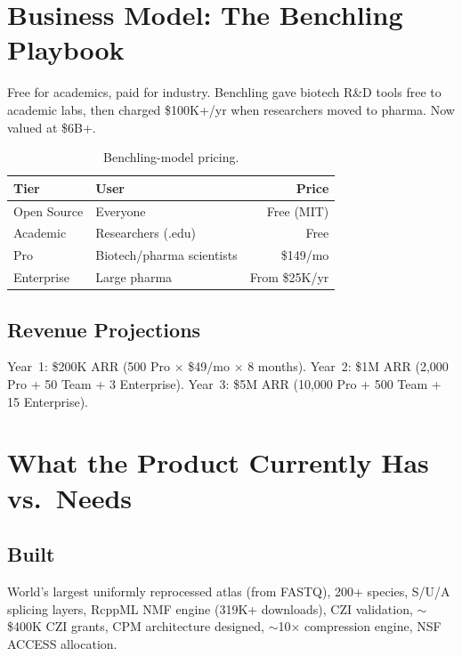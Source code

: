 \documentclass[10pt,twocolumn,letterpaper]{article}
\begin{document}
\section{Business Model: The Benchling Playbook}
\label{sec:benchling}

Free for academics, paid for industry. Benchling gave biotech R\&D tools free
to academic labs, then charged \$100K+/yr when researchers moved to pharma.
Now valued at \$6B+.

\begin{table}[h]
\centering
\small
\begin{tabular}{@{}llr@{}}
\toprule
\textbf{Tier} & \textbf{User} & \textbf{Price} \\
\midrule
Open Source & Everyone & Free (MIT) \\
Academic & Researchers (.edu) & Free \\
Pro & Biotech/pharma scientists & \$149/mo \\
Enterprise & Large pharma & From \$25K/yr \\
\bottomrule
\end{tabular}
\caption{Benchling-model pricing.}
\label{tab:benchling}
\end{table}

\subsection{Revenue Projections}

Year~1: \$200K ARR (500 Pro $\times$ \$49/mo $\times$ 8 months).
Year~2: \$1M ARR (2,000 Pro + 50 Team + 3 Enterprise).
Year~3: \$5M ARR (10,000 Pro + 500 Team + 15 Enterprise).

\section{What the Product Currently Has vs.\ Needs}
\label{sec:status}

\subsection{Built}

World's largest uniformly reprocessed atlas (from FASTQ), 200+ species, S/U/A
splicing layers, RcppML NMF engine (319K+ downloads), CZI validation,
$\sim$\$400K CZI grants, CPM architecture designed, $\sim$10$\times$ compression
engine, NSF ACCESS allocation.
\end{document}
